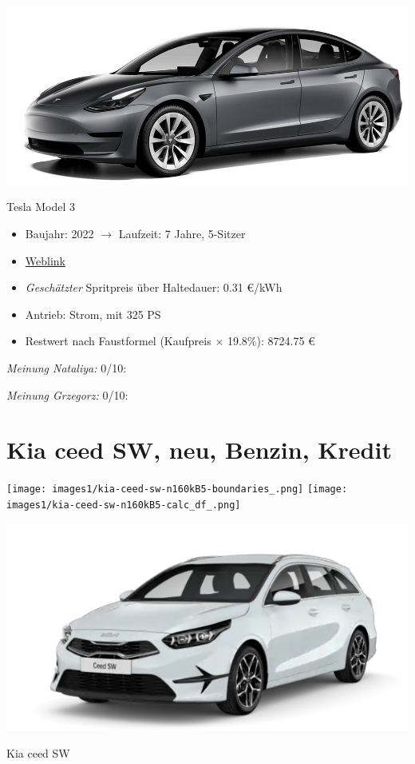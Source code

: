 \documentclass[landscape, DIV=99, 14pt]{scrartcl}
\begin{document}
\pagebreak
\begin{center}
\includegraphics[width=0.9\columnwidth]{cars/tesla-model-3.jpg}

Tesla Model 3
\end{center}

\begin{itemize}
    \item Baujahr: 2022 $\rightarrow$ Laufzeit: 7 Jahre, 5-Sitzer
    \item \href{https://www.tesla.com/de_de/model3/design\#overview}{Weblink}
    \item \emph{Gesch\"atzter} Spritpreis \"uber Haltedauer: 0.31 \euro{}/kWh
    \item Antrieb: Strom, mit 325 PS
    \item Restwert nach Faustformel (Kaufpreis $\times$ 19.8\%): 8724.75 \euro{}
\end{itemize}

\begin{small}
\emph{Meinung Nataliya:} 0/10: 
        
\emph{Meinung Grzegorz:} 0/10: 
\end{small}

\pagebreak


\twocolumn

\section*{Kia ceed SW, neu, Benzin, Kredit}
\begin{center}
\texttt{[image: images1/kia-ceed-sw-n160kB5-boundaries\_.png]}
\null
\vspace{0.5cm}
\texttt{[image: images1/kia-ceed-sw-n160kB5-calc\_df\_.png]}
\end{center}

\pagebreak
\begin{center}
\includegraphics[width=0.9\columnwidth]{cars/kia-ceed-sportswagon.png}

Kia ceed SW
\end{center}
\end{document}
